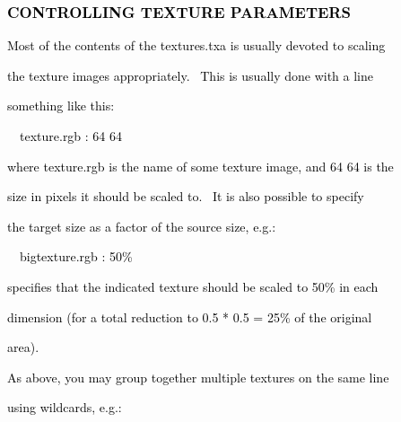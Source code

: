 \documentclass[a4paper]{article}
\newcommand\textstyleOOoComputerKeyWord[1]{\textrm{\textcolor[rgb]{0.0,0.0,0.5019608}{#1}}}
\begin{document}
\subsubsection[CONTROLLING TEXTURE PARAMETERS]{\textstyleOOoComputerKeyWord{\textcolor{black}{CONTROLLING TEXTURE
PARAMETERS}}}
\hypertarget{RefHeading7664869075401}{}
\bigskip

{\color{black}
\textstyleOOoComputerKeyWord{\textcolor{black}{Most of the contents of the textures.txa is usually devoted to scaling}}}

{\color{black}
\textstyleOOoComputerKeyWord{\textcolor{black}{the texture images appropriately. \ This is usually done with a line}}}

{\color{black}
\textstyleOOoComputerKeyWord{\textcolor{black}{something like this:}}}


\bigskip

{\color{black}
\textstyleOOoComputerKeyWord{\textcolor{black}{\ \ texture.rgb : 64 64}}}


\bigskip

{\color{black}
\textstyleOOoComputerKeyWord{\textcolor{black}{where texture.rgb is the name of some texture image, and 64 64 is the}}}

{\color{black}
\textstyleOOoComputerKeyWord{\textcolor{black}{size in pixels it should be scaled to. \ It is also possible to
specify}}}

{\color{black}
\textstyleOOoComputerKeyWord{\textcolor{black}{the target size as a factor of the source size, e.g.:}}}


\bigskip

{\color{black}
\textstyleOOoComputerKeyWord{\textcolor{black}{\ \ bigtexture.rgb : 50\%}}}


\bigskip

{\color{black}
\textstyleOOoComputerKeyWord{\textcolor{black}{specifies that the indicated texture should be scaled to 50\% in each}}}

{\color{black}
\textstyleOOoComputerKeyWord{\textcolor{black}{dimension (for a total reduction to 0.5 * 0.5 = 25\% of the original}}}

{\color{black}
\textstyleOOoComputerKeyWord{\textcolor{black}{area).}}}


\bigskip

{\color{black}
\textstyleOOoComputerKeyWord{\textcolor{black}{As above, you may group together multiple textures on the same line}}}

{\color{black}
\textstyleOOoComputerKeyWord{\textcolor{black}{using wildcards, e.g.:}}}
\end{document}
